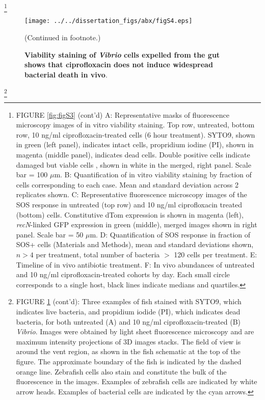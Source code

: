 {\let\thefootnote\relax\footnote{FIGURE \ref{fig:figS3} (cont'd) A: Representative masks of fluorescence microscopy images of in vitro viability staining. Top row, untreated, bottom row, 10 ng/ml ciprofloxacin-treated cells (6 hour treatment). SYTO9, shown in green (left panel), indicates intact cells, propridium iodine (PI), shown in magenta (middle panel), indicates dead cells. Double positive cells indicate damaged but viable cells \cite{ben2005genetic}, shown in white in the merged, right panel. Scale bar = 100 $\mu$m. B: Quantification of in vitro viability staining by fraction of cells corresponding to each case. Mean and standard deviation across 2 replicates shown. C: Representative fluorescence microscopy images of the SOS response in untreated (top row) and 10 ng/ml ciprofloxacin treated (bottom) cells. Constitutive dTom expression is shown in magenta (left), \textit{recN}-linked GFP expression in green (middle), merged images shown in right panel. Scale bar = 50 $\mu$m. D: Quantification of SOS response in fraction of SOS+ cells (Materials and Methods), mean and standard deviations shown, $n>4$ per treatment, total number of bacteria $>$ 120 cells per treatment. E: Timeline of in vivo antibiotic treatment. F: In vivo abundances of untreated and 10 ng/ml ciprofloxacin-treated cohorts by day. Each small circle corresponds to a single host, black lines indicate medians and quartiles.}


\begin{figure}[H]
	\centerline{
		\texttt{[image: ../../dissertation\_figs/abx/figS4.eps]}}
	\caption{\textbf{Viability staining of \textit{Vibrio} cells expelled from the gut shows that ciprofloxacin does not induce widespread bacterial death in vivo}.}{(Continued in footnote.)}
	\label{fig:figS4}
\end{figure}

{\let\thefootnote\relax\footnote{FIGURE \ref{fig:figS4} (cont'd): Three examples of fish stained with SYTO9, which indicates live bacteria, and propidium iodide (PI), which indicates dead bacteria, for both untreated (A) and 10 ng/ml ciprofloxacin-treated (B) \textit{Vibrio}. Images were obtained by light sheet fluorescence microscopy and are maximum intensity projections of 3D images stacks. The field of view is around the vent region, as shown in the fish schematic at the top of the figure. The approximate boundary of the fish is indicated by the dashed orange line. Zebrafish cells also stain and constitute the bulk of the fluorescence in the images. Examples of zebrafish cells are indicated by white arrow heads. Examples of bacterial cells are indicated by the cyan arrows.}
		
}}
